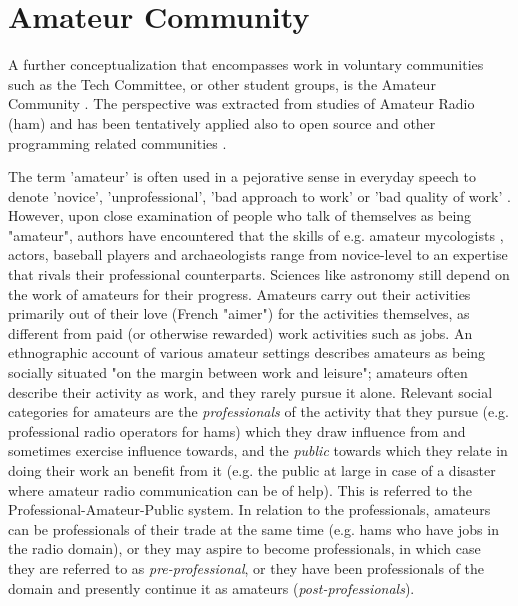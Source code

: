 \documentclass{sig-alt-release2}
\begin{document}
\section{Amateur Community}\label{sec:amateur}
A further conceptualization that encompasses work in voluntary communities such as the Tech Committee, or other student groups, is the Amateur Community \cite{bogdan03, bogdan_bowers07}. The perspective was extracted from studies of Amateur Radio (ham) \cite{bogdan_bowers07} and has been tentatively applied also to open source and other programming related communities \cite{bogdan03}. 

The term 'amateur' is often used in a pejorative sense in everyday speech to denote 'novice', 'unprofessional', 'bad approach to work' or 'bad quality of work' . However, upon close examination of people who talk of themselves as being "amateur", authors have encountered that the skills of e.g. amateur mycologists \cite{fine98}, actors, baseball players and archaeologists \cite{stebbins79} range from novice-level to an expertise that rivals their professional counterparts. Sciences like astronomy still depend on the work of amateurs for their progress. Amateurs carry out their activities primarily out of their love (French "aimer") for the activities themselves, as different from paid (or otherwise rewarded) work activities such as jobs. An ethnographic account of various amateur settings \cite{stebbins79} describes amateurs as being socially situated "on the margin between work and leisure"; amateurs often describe their activity as work, and they rarely pursue it alone. Relevant social categories for amateurs are the \textit{professionals} of the activity that they pursue (e.g. professional radio operators for hams) which they draw influence from and sometimes exercise influence towards, and the \textit{public} towards which they relate in doing their work an benefit from it (e.g. the public at large in case of a disaster where amateur radio communication can be of help). This is referred to the Professional-Amateur-Public system. In relation to the professionals, amateurs can be professionals of their trade at the same time (e.g. hams who have jobs in the radio domain), or they may aspire to become professionals, in which case they are referred to as \textit{pre-professional}, or they have been professionals of the domain and presently continue it as amateurs (\textit{post-professionals}).
\end{document}
